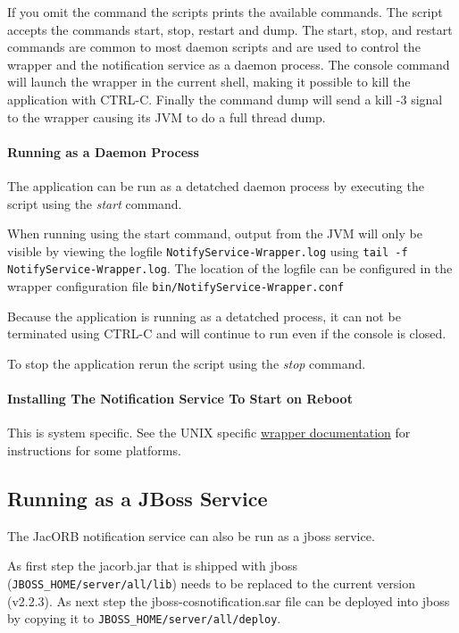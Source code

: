  If you omit the command the scripts prints the available commands.
 The script accepts the commands start, stop, restart and dump. The
 start, stop, and restart commands are common to most daemon scripts
 and are used to control the wrapper and the notification service  as
 a daemon process. The console 
 command will launch the wrapper in the current shell, making it
 possible to kill the application with CTRL-C. Finally the command
 dump will send a kill -3 signal to the wrapper causing its JVM
 to do a full thread dump.  
 
 \paragraph{Running as a Daemon Process}
 \label{sec:running-as-daemon}
 
 The application can be run as a detatched daemon process by executing
 the script using the \emph{start} command. 

 When running using the start  command, output from the JVM will only
 be visible by viewing the logfile \texttt{NotifyService-Wrapper.log}
 using \texttt{tail -f NotifyService-Wrapper.log}. The location of the
 logfile can be configured in the wrapper configuration file
 \texttt{bin/NotifyService-Wrapper.conf} 

 Because the application is running as a detatched process, it can not
 be terminated using CTRL-C and will continue to run even if the
 console is closed. 
 
 To stop the application rerun the script using the \emph{stop} command.
 
 \paragraph{Installing The Notification Service To Start on Reboot}
 \label{sec:inst-appl-start}

 This is system specific. See the UNIX specific
 \href{http://wrapper.tanukisoftware.org/doc/english/launch-nix.html}{wrapper
   documentation} for instructions for some platforms.

\subsection{Running as a JBoss Service}

The JacORB notification service can also be run as a jboss service.

As first step the jacorb.jar that is shipped with jboss (\texttt{JBOSS\_HOME/server/all/lib})
needs to be replaced to the current version (v2.2.3).
As next step the jboss-cosnotification.sar file can be deployed into jboss 
by copying it to \texttt{JBOSS\_HOME/server/all/deploy}.

